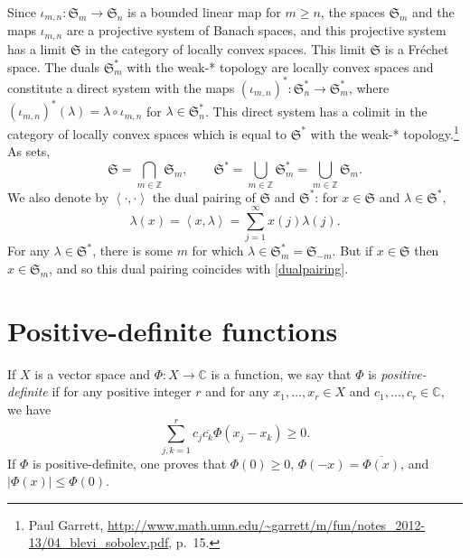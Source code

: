 \documentclass{article}
\newcommand{\inner}[2]{\left\langle #1, #2 \right\rangle}
\theoremstyle{definition}
\begin{document}
Since $\iota_{m,n}:\mathfrak{S}_m \to \mathfrak{S}_n$ is a bounded linear map for $m \geq n$, 
the spaces $\mathfrak{S}_m$ and the maps $\iota_{m,n}$ are a projective system of Banach spaces, and this projective system has a limit
$\mathfrak{S}$
in the category of locally convex spaces. This limit $\mathfrak{S}$ is a Fr\'echet space.
The duals $\mathfrak{S}_m^*$ with the weak-* topology are locally convex spaces and constitute a direct system 
with the maps
$(\iota_{m,n})^*:\mathfrak{S}_n^* \to \mathfrak{S}_m^*$, where  
$(\iota_{m,n})^*(\lambda) = \lambda \circ \iota_{m,n}$ for $\lambda \in \mathfrak{S}_n^*$.
This direct system has a colimit in the category of locally convex spaces
which is  equal to $\mathfrak{S}^*$ with the weak-* topology.\footnote{Paul Garrett, \url{http://www.math.umn.edu/~garrett/m/fun/notes_2012-13/04_blevi_sobolev.pdf}, p.~15.} As sets,
\[
\mathfrak{S} = \bigcap_{m \in \mathbb{Z}} \mathfrak{S}_m, \qquad \mathfrak{S}^* = \bigcup_{m \in \mathbb{Z}} \mathfrak{S}_m^*
=\bigcup_{m \in \mathbb{Z}} \mathfrak{S}_m.
\]
We also denote by $\inner{\cdot}{\cdot}$ the dual pairing of $\mathfrak{S}$ and $\mathfrak{S}^*$: for $x \in \mathfrak{S}$ and
$\lambda \in \mathfrak{S}^*$,
\[
\lambda(x)=\inner{x}{\lambda} = \sum_{j=1}^\infty x(j) \lambda(j).
\]
For any $\lambda \in \mathfrak{S}^*$, there is some $m$ for which $\lambda \in \mathfrak{S}_m^*=\mathfrak{S}_{-m}$. 
But if $x \in \mathfrak{S}$ then $x \in \mathfrak{S}_m$, and so this dual pairing coincides with \eqref{dualpairing}.




\section{Positive-definite functions}
If $X$ is a vector space and $\Phi:X \to \mathbb{C}$ is a function, we say that $\Phi$ is {\em positive-definite} if for any positive integer $r$
and for any $x_1,\ldots,x_r \in X$ and $c_1,\ldots,c_r \in \mathbb{C}$, we have
\[
\sum_{j,k=1}^r c_j \overline{c_k} \Phi(x_j-x_k) \geq 0.
\]
If $\Phi$ is positive-definite, one proves that $\Phi(0) \geq 0$, $\Phi(-x)=\overline{\Phi(x)}$, and $|\Phi(x)| \leq \Phi(0)$. 
\end{document}

